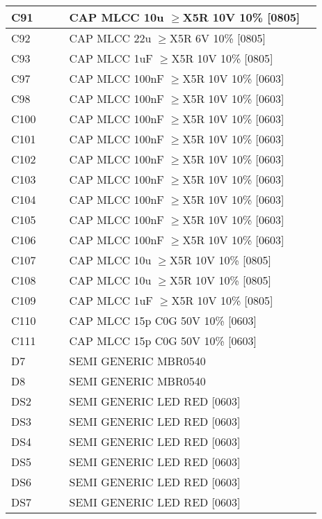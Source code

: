 \begin{longtable}{|l|l|l|l|l|}
\hline
C91 &  &  & CAP MLCC 10u \ensuremath{\geq}X5R 10V 10\% [0805] &  \\
\hline
C92 &  &  & CAP MLCC 22u \ensuremath{\geq}X5R 6V 10\% [0805] &  \\
\hline
C93 &  &  & CAP MLCC 1uF \ensuremath{\geq}X5R 10V 10\% [0805] &  \\
\hline
C97 &  &  & CAP MLCC 100nF \ensuremath{\geq}X5R 10V 10\% [0603] &  \\
\hline
C98 &  &  & CAP MLCC 100nF \ensuremath{\geq}X5R 10V 10\% [0603] &  \\
\hline
C100 &  &  & CAP MLCC 100nF \ensuremath{\geq}X5R 10V 10\% [0603] &  \\
\hline
C101 &  &  & CAP MLCC 100nF \ensuremath{\geq}X5R 10V 10\% [0603] &  \\
\hline
C102 &  &  & CAP MLCC 100nF \ensuremath{\geq}X5R 10V 10\% [0603] &  \\
\hline
C103 &  &  & CAP MLCC 100nF \ensuremath{\geq}X5R 10V 10\% [0603] &  \\
\hline
C104 &  &  & CAP MLCC 100nF \ensuremath{\geq}X5R 10V 10\% [0603] &  \\
\hline
C105 &  &  & CAP MLCC 100nF \ensuremath{\geq}X5R 10V 10\% [0603] &  \\
\hline
C106 &  &  & CAP MLCC 100nF \ensuremath{\geq}X5R 10V 10\% [0603] &  \\
\hline
C107 &  &  & CAP MLCC 10u \ensuremath{\geq}X5R 10V 10\% [0805] &  \\
\hline
C108 &  &  & CAP MLCC 10u \ensuremath{\geq}X5R 10V 10\% [0805] &  \\
\hline
C109 &  &  & CAP MLCC 1uF \ensuremath{\geq}X5R 10V 10\% [0805] &  \\
\hline
C110 &  &  & CAP MLCC 15p C0G 50V 10\% [0603] &  \\
\hline
C111 &  &  & CAP MLCC 15p C0G 50V 10\% [0603] &  \\
\hline
D7 &  &  & SEMI GENERIC MBR0540 &  \\
\hline
D8 &  &  & SEMI GENERIC MBR0540 &  \\
\hline
DS2 &  &  & SEMI GENERIC LED RED [0603] &  \\
\hline
DS3 &  &  & SEMI GENERIC LED RED [0603] &  \\
\hline
DS4 &  &  & SEMI GENERIC LED RED [0603] &  \\
\hline
DS5 &  &  & SEMI GENERIC LED RED [0603] &  \\
\hline
DS6 &  &  & SEMI GENERIC LED RED [0603] &  \\
\hline
DS7 &  &  & SEMI GENERIC LED RED [0603] &  \\

\end{longtable}
